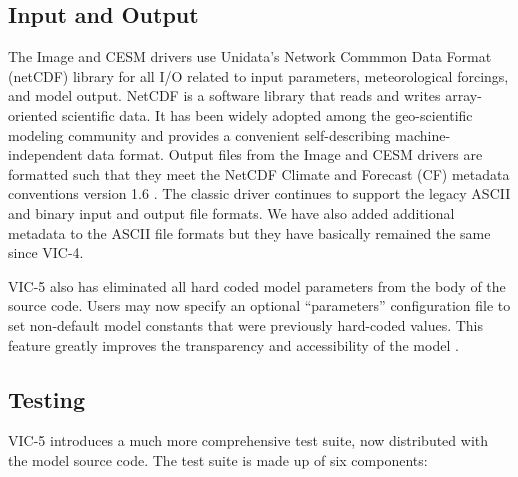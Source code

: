\documentclass[gmd, manuscript]{copernicus}
\begin{document}
  \subsection{Input and Output}
    \label{sec:io}
    The Image and CESM drivers use Unidata's Network Commmon Data Format (netCDF) library for all I/O related to input parameters, meteorological forcings, and model output.
    NetCDF is a software library that reads and writes array-oriented scientific data.
    It has been widely adopted among the geo-scientific modeling community and provides a convenient self-describing machine-independent data format.
    Output files from the Image and CESM drivers are formatted such that they meet the NetCDF Climate and Forecast (CF) metadata conventions version 1.6 \citep{Eaton_2003}.
    The classic driver continues to support the legacy ASCII and binary input and output file formats.
    We have also added additional metadata to the ASCII file formats but they have basically remained the same since VIC-4.

    VIC-5 also has eliminated all hard coded model parameters from the body of the source code.
    Users may now specify an optional ``parameters'' configuration file to set non-default model constants that were previously hard-coded values.
    This feature greatly improves the transparency and accessibility of the model \citep{Mendoza_2015}.

  \subsection{Testing}
    \label{sec:testing}
    VIC-5 introduces a much more comprehensive test suite, now distributed with the model source code.
    The test suite is made up of six components:
\end{document}
